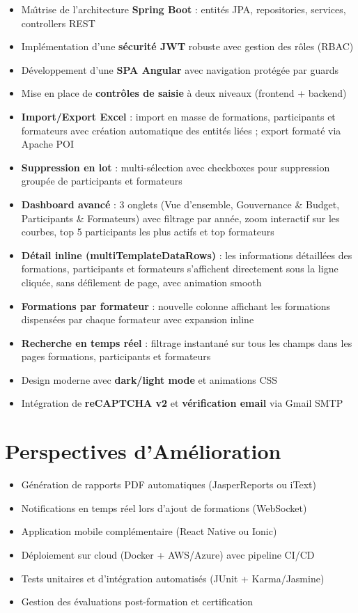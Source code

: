\documentclass[12pt,a4paper]{report}
\begin{document}
\begin{itemize}
  \item Ma\^{\i}trise de l'architecture \textbf{Spring Boot} : entit\'{e}s JPA, repositories, services, controllers REST
  \item Impl\'{e}mentation d'une \textbf{s\'{e}curit\'{e} JWT} robuste avec gestion des r\^{o}les (RBAC)
  \item D\'{e}veloppement d'une \textbf{SPA Angular} avec navigation prot\'{e}g\'{e}e par guards
  \item Mise en place de \textbf{contr\^{o}les de saisie} \`{a} deux niveaux (frontend + backend)
  \item \textbf{Import/Export Excel} : import en masse de formations, participants et formateurs avec cr\'{e}ation automatique des entit\'{e}s li\'{e}es ; export format\'{e} via Apache POI
  \item \textbf{Suppression en lot} : multi-s\'{e}lection avec checkboxes pour suppression group\'{e}e de participants et formateurs
  \item \textbf{Dashboard avanc\'{e}} : 3 onglets (Vue d'ensemble, Gouvernance \& Budget, Participants \& Formateurs) avec filtrage par ann\'{e}e, zoom interactif sur les courbes, top 5 participants les plus actifs et top formateurs
  \item \textbf{D\'{e}tail inline (multiTemplateDataRows)} : les informations d\'{e}taill\'{e}es des formations, participants et formateurs s'affichent directement sous la ligne cliqu\'{e}e, sans d\'{e}filement de page, avec animation smooth
  \item \textbf{Formations par formateur} : nouvelle colonne affichant les formations dispens\'{e}es par chaque formateur avec expansion inline
  \item \textbf{Recherche en temps r\'{e}el} : filtrage instantan\'{e} sur tous les champs dans les pages formations, participants et formateurs
  \item Design moderne avec \textbf{dark/light mode} et animations CSS
  \item Int\'{e}gration de \textbf{reCAPTCHA v2} et \textbf{v\'{e}rification email} via Gmail SMTP
\end{itemize}

\section{Perspectives d'Am\'{e}lioration}

\begin{itemize}
  \item G\'{e}n\'{e}ration de rapports PDF automatiques (JasperReports ou iText)
  \item Notifications en temps r\'{e}el lors d'ajout de formations (WebSocket)
  \item Application mobile compl\'{e}mentaire (React Native ou Ionic)
  \item D\'{e}ploiement sur cloud (Docker + AWS/Azure) avec pipeline CI/CD
  \item Tests unitaires et d'int\'{e}gration automatis\'{e}s (JUnit + Karma/Jasmine)
  \item Gestion des \'{e}valuations post-formation et certification
\end{itemize}
\end{document}
